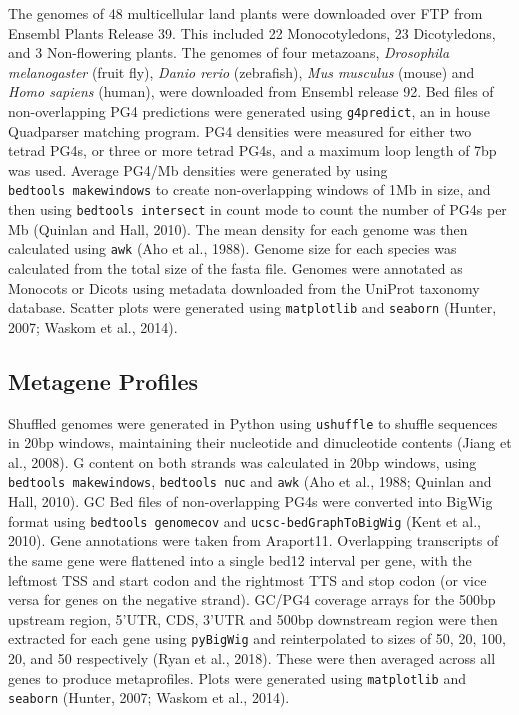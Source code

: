 \documentclass[12pt,a4paper,]{report}
\begin{document}
The genomes of 48 multicellular land plants were downloaded over FTP
from Ensembl Plants Release 39. This included 22 Monocotyledons, 23
Dicotyledons, and 3 Non-flowering plants. The genomes of four metazoans,
\emph{Drosophila melanogaster} (fruit fly), \emph{Danio rerio}
(zebrafish), \emph{Mus musculus} (mouse) and \emph{Homo sapiens}
(human), were downloaded from Ensembl release 92. Bed files of
non-overlapping PG4 predictions were generated using \texttt{g4predict},
an in house Quadparser matching program. PG4 densities were measured for
either two tetrad PG4s, or three or more tetrad PG4s, and a maximum loop
length of 7bp was used. Average PG4/Mb densities were generated by using
\texttt{bedtools\ makewindows} to create non-overlapping windows of 1Mb
in size, and then using \texttt{bedtools\ intersect} in count mode to
count the number of PG4s per Mb (Quinlan and Hall, 2010). The mean
density for each genome was then calculated using \texttt{awk} (Aho et
al., 1988). Genome size for each species was calculated from the total
size of the fasta file. Genomes were annotated as Monocots or Dicots
using metadata downloaded from the UniProt taxonomy database. Scatter
plots were generated using \texttt{matplotlib} and \texttt{seaborn}
(Hunter, 2007; Waskom et al., 2014).

\hypertarget{metagene-profiles}{%
\subsection{Metagene Profiles}\label{metagene-profiles}}

Shuffled genomes were generated in Python using \texttt{ushuffle} to
shuffle sequences in 20bp windows, maintaining their nucleotide and
dinucleotide contents (Jiang et al., 2008). G content on both strands
was calculated in 20bp windows, using \texttt{bedtools\ makewindows},
\texttt{bedtools\ nuc} and \texttt{awk} (Aho et al., 1988; Quinlan and
Hall, 2010). GC Bed files of non-overlapping PG4s were converted into
BigWig format using \texttt{bedtools\ genomecov} and
\texttt{ucsc-bedGraphToBigWig} (Kent et al., 2010). Gene annotations
were taken from Araport11. Overlapping transcripts of the same gene were
flattened into a single bed12 interval per gene, with the leftmost TSS
and start codon and the rightmost TTS and stop codon (or vice versa for
genes on the negative strand). GC/PG4 coverage arrays for the 500bp
upstream region, 5'UTR, CDS, 3'UTR and 500bp downstream region were then
extracted for each gene using \texttt{pyBigWig} and reinterpolated to
sizes of 50, 20, 100, 20, and 50 respectively (Ryan et al., 2018). These
were then averaged across all genes to produce metaprofiles. Plots were
generated using \texttt{matplotlib} and \texttt{seaborn} (Hunter, 2007;
Waskom et al., 2014).
\end{document}
